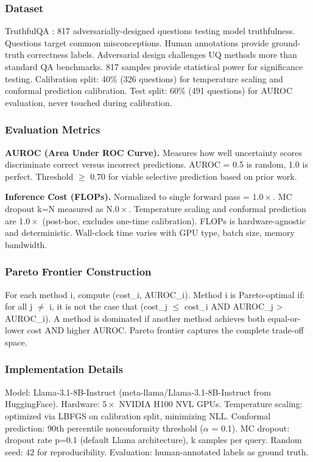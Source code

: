 \subsubsection{Dataset}

TruthfulQA \citep{Lin2021TruthfulQA}: 817 adversarially-designed questions testing model truthfulness. Questions target common misconceptions. Human annotations provide ground-truth correctness labels. Adversarial design challenges UQ methods more than standard QA benchmarks. 817 samples provide statistical power for significance testing. Calibration split: 40\% (326 questions) for temperature scaling and conformal prediction calibration. Test split: 60\% (491 questions) for AUROC evaluation, never touched during calibration.

\subsubsection{Evaluation Metrics}

\textbf{AUROC (Area Under ROC Curve).} Measures how well uncertainty scores discriminate correct versus incorrect predictions. AUROC = 0.5 is random, 1.0 is perfect. Threshold $\geq$ 0.70 for viable selective prediction based on prior work.

\textbf{Inference Cost (FLOPs).} Normalized to single forward pass = 1.$0\times$. MC dropout k=N measured as N.$0\times$. Temperature scaling and conformal prediction are 1.$0\times$ (post-hoc, excludes one-time calibration). FLOPs is hardware-agnostic and deterministic. Wall-clock time varies with GPU type, batch size, memory bandwidth.

\subsubsection{Pareto Frontier Construction}

For each method i, compute (cost\_i, AUROC\_i). Method i is Pareto-optimal if: for all j $\neq$ i, it is not the case that (cost\_j $\leq$ cost\_i AND AUROC\_j > AUROC\_i). A method is dominated if another method achieves both equal-or-lower cost AND higher AUROC. Pareto frontier captures the complete trade-off space.

\subsubsection{Implementation Details}

Model: Llama-3.1-8B-Instruct (meta-llama/Llama-3.1-8B-Instruct from HuggingFace). Hardware: $5\times$ NVIDIA H100 NVL GPUs. Temperature scaling: optimized via LBFGS on calibration split, minimizing NLL. Conformal prediction: 90th percentile nonconformity threshold ($\alpha$ = 0.1). MC dropout: dropout rate p=0.1 (default Llama architecture), k samples per query. Random seed: 42 for reproducibility. Evaluation: human-annotated labels as ground truth.
